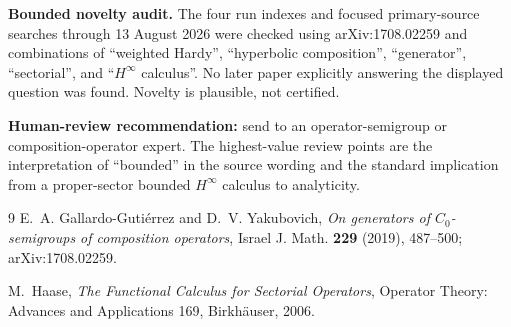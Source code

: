 \documentclass[10pt]{article}
\begin{document}
\textbf{Bounded novelty audit.}
The four run indexes and focused primary-source searches through
13 August 2026 were checked using arXiv:1708.02259 and combinations of
``weighted Hardy'', ``hyperbolic composition'', ``generator'',
``sectorial'', and ``$H^\infty$ calculus''.  No later paper explicitly
answering the displayed question was found.  Novelty is plausible, not
certified.

\textbf{Human-review recommendation:} send to an operator-semigroup or
composition-operator expert.  The highest-value review points are the
interpretation of ``bounded'' in the source wording and the standard
implication from a proper-sector bounded $H^\infty$ calculus to analyticity.

\begin{thebibliography}{9}
E.~A. Gallardo-Guti\'errez and D.~V. Yakubovich,
\emph{On generators of $C_0$-semigroups of composition operators},
Israel J. Math. \textbf{229} (2019), 487--500;
arXiv:1708.02259.

M.~Haase,
\emph{The Functional Calculus for Sectorial Operators},
Operator Theory: Advances and Applications 169, Birkh\"auser, 2006.
\end{thebibliography}
\end{document}
